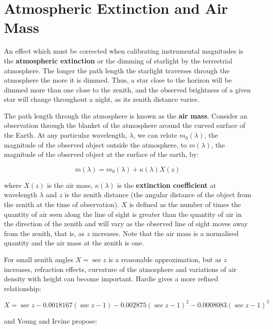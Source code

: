 \documentclass[twoside,11pt]{article}
\newcommand{\xlabel}[1]{}
\begin{document}
\section{\xlabel{AIRMASS}\label{AIRMASS}Atmospheric Extinction and Air Mass}

An effect which must be corrected when calibrating instrumental
magnitudes is the {\bf atmospheric extinction} or the dimming of
starlight by the terrestrial atmosphere.  The longer the path length
the starlight traverses through the atmosphere the more it is
dimmed.  Thus, a star close to the horizon will be dimmed more than one
close to the zenith, and the observed brightness of a given star will
change throughout a night, as its zenith distance varies.

The path length through the atmosphere is known as the {\bf air mass}.
Consider an observation through the blanket of the atmosphere around
the curved surface of the Earth. At any particular wavelength, $\lambda$,
we can relate $m_0(\lambda)$, the magnitude of the observed object
outside the atmosphere, to $m(\lambda)$, the magnitude of the observed
object at the surface of the earth, by:

\begin{equation}
m(\lambda) = m_0(\lambda)  + \kappa(\lambda)X(z)
\end{equation}

where $X(z)$ is the air mass, $\kappa(\lambda)$ is the {\bf extinction
coefficient} at wavelength $\lambda$ and $z$ is the zenith distance (the
angular distance of the object from the zenith at the time of observation).
$X$ is defined as the number of times the quantity of air seen along the
line of sight is greater than the quantity of air in the direction of the
zenith and will vary as the observed line of sight moves away from the
zenith, that is, as $z$ increases.  Note that the air mass is a
normalised quantity and the air mass at the zenith is one.

For small zenith angles $X=\sec z$ is a reasonable approximation, but
as $z$ increases, refraction effects, curvature of the atmosphere and
variations of air density with height can become important.
Hardie\cite{HARDIE62} gives a more refined relationship:

\begin{equation}
X= \sec z - 0.0018167(\sec z -1) - 0.002875(\sec z -1)^2 -
0.0008083(\sec z -1)^3
\end{equation}

and Young and Irvine\cite{YOUNG67} propose:
\end{document}
